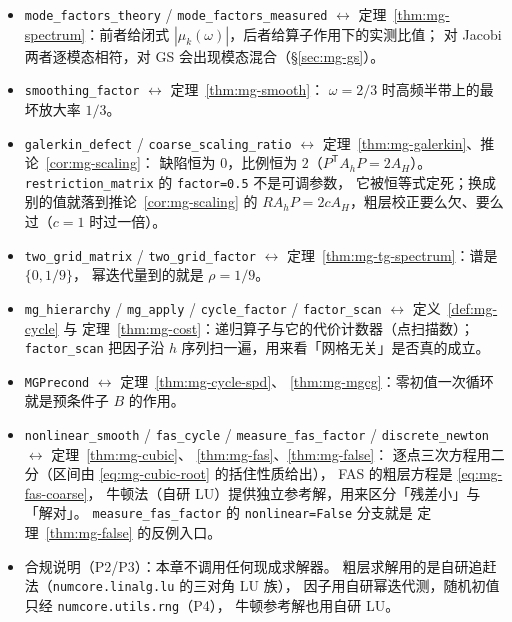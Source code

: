 \begin{itemize}
  \item \texttt{mode\_factors\_theory} / \texttt{mode\_factors\_measured}
        $\leftrightarrow$ 定理~\ref{thm:mg-spectrum}：前者给闭式
        $|\mu_k(\omega)|$，后者给算子作用下的实测比值；
        对 Jacobi 两者逐模态相符，对 GS 会出现模态混合（\S\ref{sec:mg-gs}）。
  \item \texttt{smoothing\_factor} $\leftrightarrow$ 定理~\ref{thm:mg-smooth}：
        $\omega=2/3$ 时高频半带上的最坏放大率 $1/3$。
  \item \texttt{galerkin\_defect} / \texttt{coarse\_scaling\_ratio}
        $\leftrightarrow$ 定理~\ref{thm:mg-galerkin}、推论~\ref{cor:mg-scaling}：
        缺陷恒为 $0$，比例恒为 $2$（$P^{\mathsf T}A_hP=2A_H$）。
        \texttt{restriction\_matrix} 的 \texttt{factor=0.5} 不是可调参数，
        它被恒等式定死；换成别的值就落到推论~\ref{cor:mg-scaling} 的
        $RA_hP=2cA_H$，粗层校正要么欠、要么过（$c=1$ 时过一倍）。
  \item \texttt{two\_grid\_matrix} / \texttt{two\_grid\_factor}
        $\leftrightarrow$ 定理~\ref{thm:mg-tg-spectrum}：谱是 $\{0,1/9\}$，
        幂迭代量到的就是 $\rho=1/9$。
  \item \texttt{mg\_hierarchy} / \texttt{mg\_apply} / \texttt{cycle\_factor} /
        \texttt{factor\_scan} $\leftrightarrow$ 定义~\ref{def:mg-cycle} 与
        定理~\ref{thm:mg-cost}：递归算子与它的代价计数器（点扫描数）；
        \texttt{factor\_scan} 把因子沿 $h$ 序列扫一遍，用来看「网格无关」是否真的成立。
  \item \texttt{MGPrecond} $\leftrightarrow$ 定理~\ref{thm:mg-cycle-spd}、
        \ref{thm:mg-mgcg}：零初值一次循环就是预条件子 $B$ 的作用。
  \item \texttt{nonlinear\_smooth} / \texttt{fas\_cycle} / \texttt{measure\_fas\_factor} /
        \texttt{discrete\_newton} $\leftrightarrow$ 定理~\ref{thm:mg-cubic}、
        \ref{thm:mg-fas}、\ref{thm:mg-false}：
        逐点三次方程用二分（区间由 \eqref{eq:mg-cubic-root} 的括住性质给出），
        FAS 的粗层方程是 \eqref{eq:mg-fas-coarse}，
        牛顿法（自研 LU）提供独立参考解，用来区分「残差小」与「解对」。
        \texttt{measure\_fas\_factor} 的 \texttt{nonlinear=False} 分支就是
        定理~\ref{thm:mg-false} 的反例入口。
  \item 合规说明（P2/P3）：本章不调用任何现成求解器。
        粗层求解用的是自研追赶法（\texttt{numcore.linalg.lu} 的三对角 LU 族），
        因子用自研幂迭代测，随机初值只经 \texttt{numcore.utils.rng}（P4），
        牛顿参考解也用自研 LU。
\end{itemize}

